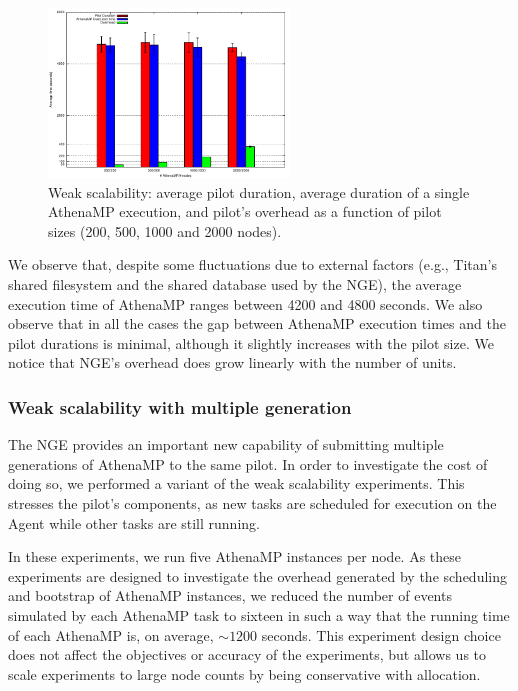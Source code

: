 \begin{figure}[!htb]
        \includegraphics[height=4.5cm,width=\columnwidth]{./figures/NGE/weak1.pdf}
    \caption{Weak scalability: average pilot duration, average  duration of a
    single AthenaMP execution, and pilot's overhead as a function of pilot sizes (200, 500, 1000 and 2000 nodes).}
\label{fig:weakScal1a}
\end{figure}

We observe that, despite some fluctuations due to external factors (e.g.,
Titan's shared filesystem and the shared database used by the NGE), the average
execution time of AthenaMP  ranges between 4200 and 4800 seconds.  We  also
observe that in all the cases the gap between AthenaMP execution times and the
pilot durations is minimal, although it slightly increases with the pilot size.
We  notice that NGE's overhead does grow linearly with the number of units.

\subsubsection{Weak scalability with multiple generation }

The NGE provides an important new capability of submitting multiple generations
of AthenaMP to the same pilot. In order to investigate the cost of doing so, we
performed a variant of the weak scalability experiments. This stresses the
pilot's components, as new tasks are scheduled for execution on the Agent while
other tasks are still running.

In these experiments, we run five AthenaMP instances per node.  As these
experiments are designed to investigate the overhead generated by the scheduling
and bootstrap of AthenaMP instances, we reduced the number of events simulated
by each AthenaMP task to sixteen in such a way that the running time of each
AthenaMP is, on average, $\sim 1200$ seconds. This experiment design choice does
not affect the  objectives or accuracy of the experiments, but allows us to
scale experiments to large node counts by being conservative with allocation.

